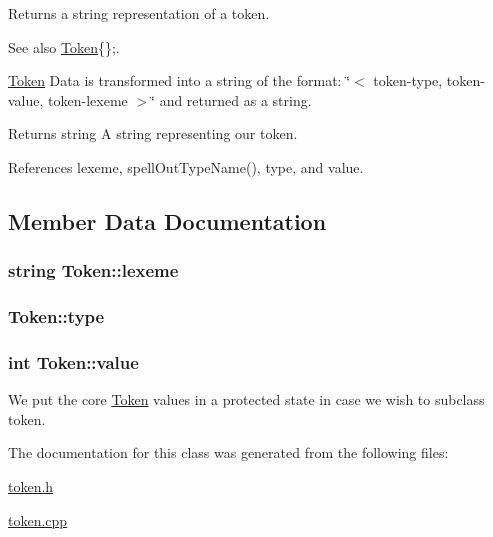 Returns a string representation of a token.

\begin{DoxySeeAlso}{See also}
\hyperlink{classToken}{Token}\{\};.
\end{DoxySeeAlso}
\hyperlink{classToken}{Token} Data is transformed into a string of the format: \char`\"{}$<$ token-\/type, token-\/value, token-\/lexeme $>$\char`\"{} and returned as a string. \begin{DoxyReturn}{Returns}
string A string representing our token. 
\end{DoxyReturn}


References lexeme, spellOutTypeName(), type, and value.



\subsection{Member Data Documentation}
\hypertarget{classToken_af4c57a4ede01f2040ea4927141f5a661}{
\subsubsection[{lexeme}]{\setlength{\rightskip}{0pt plus 5cm}string {\bf Token::lexeme}}}
\label{classToken_af4c57a4ede01f2040ea4927141f5a661}
\hypertarget{classToken_a7e5e6513d379ca2e388273b23ea1ba4a}{
\subsubsection[{type}]{ {\bf Token::type}}}
\label{classToken_a7e5e6513d379ca2e388273b23ea1ba4a}
\hypertarget{classToken_a041346a45c6c5571a78a6af3394a2756}{
\subsubsection[{value}]{\setlength{\rightskip}{0pt plus 5cm}int {\bf Token::value}}}
\label{classToken_a041346a45c6c5571a78a6af3394a2756}


We put the core \hyperlink{classToken}{Token} values in a protected state in case we wish to subclass token. 



The documentation for this class was generated from the following files:\begin{DoxyCompactItemize}
\item 
\hyperlink{token_8h}{token.h}\item 
\hyperlink{token_8cpp}{token.cpp}\end{DoxyCompactItemize}
